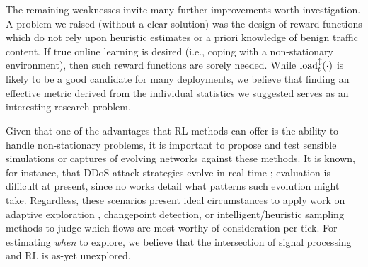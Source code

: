 \documentclass[10pt, times, comsoc]{IEEEtran}
\begin{document}
The remaining weaknesses invite many further improvements worth investigation.
A problem we raised (without a clear solution) was the design of reward functions which do not rely upon heuristic estimates or a priori knowledge of benign traffic content.
If true online learning is desired (i.e., coping with a non-stationary environment), then such reward functions are sorely needed.
While $\operatorname{load}^{\updownarrow}_{t}(\cdot)$ is likely to be a good candidate for many deployments, we believe that finding an effective metric derived from the individual statistics we suggested serves as an interesting research problem.

Given that one of the advantages that RL methods can offer is the ability to handle non-stationary problems, it is important to propose and test sensible simulations or captures of evolving networks against these methods.
It is known, for instance, that DDoS attack strategies evolve in real time \cite{DBLP:conf/spw/KangGS16}; evaluation is difficult at present, since no works detail what patterns such evolution might take.
Regardless, these scenarios present ideal circumstances to apply work on adaptive exploration \cite{DBLP:conf/annpr/TokicP12}, changepoint detection, or intelligent/heuristic sampling methods to judge which flows are most worthy of consideration per tick.
For estimating \emph{when} to explore, we believe that the intersection of signal processing and RL is as-yet unexplored.
\end{document}
